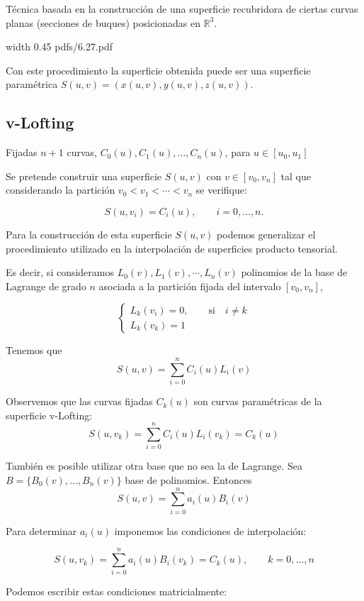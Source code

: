 \documentclass[twoside]{report}
\newcommand{\colocapdf}[2]{\quad\pdfimage width #2 {pdfs/#1.pdf}}
\begin{document}
T\'{e}cnica basada en la construcci\'{o}n de una superficie recubridora de ciertas curvas planas (secciones de buques) posicionadas en $\mathbb{R}^3.$

\begin{center}
\colocapdf{6.27}{0.45\textwidth}
\end{center}

Con este procedimiento la superficie obtenida puede ser una superficie param\'{e}trica $S(u,v)=(x(u,v),y(u,v),z(u,v))$.

\subsection{v-Lofting}

Fijadas $n+1$ curvas, $C_0(u),C_1(u), \ldots, C_n(u)$,  para $u\in [u_0,u_1]$

Se pretende construir una superficie $S(u,v)$ con  $v\in [v_0,v_n]$ tal que considerando la partici\'{o}n $v_0<v_1<\cdots <v_n$
se verifique:

$$S(u,v_i)=C_i(u),\quad \quad i=0,\ldots,n.$$

Para la construcci\'{o}n de esta superficie $S(u,v)$ podemos generalizar el procedimiento utilizado en la interpolaci\'{o}n de superficies producto tensorial.

Es decir, si consideramos $L_0(v), L_1(v), \cdots,L_n(v)$ polinomios de la base  de Lagrange de grado $n$ asociada a la partici\'{o}n fijada del intervalo $[v_0,v_n]$,

$$\left\{ \begin{array}{l}
L_k(v_i)=0,\quad \quad \mbox{si} \quad  i\neq k\\
L_k(v_k)=1
\end{array} \right.$$

Tenemos que
$$S(u,v)=\sum_{i=0}^n C_i(u) L_i(v)$$

Observemos que las curvas fijadas $C_k(u)$ son curvas param\'{e}tricas de la superficie v-Lofting:
$$S(u,v_k)=\sum_{i=0}^n C_i(u) L_i(v_k)=C_k(u)$$

Tambi\'{e}n es posible utilizar otra base que no sea la de Lagrange. Sea  $B=\{B_0(v), \ldots,B_n(v)\}$  base de polinomios. Entonces
$$S(u,v)=\sum_{i=0}^n a_i(u) B_i(v)$$

Para determinar $a_i(u)$ imponemos las condiciones de interpolaci\'{o}n:

$$S(u,v_k)=\sum_{i=0}^n a_i(u) B_i(v_k)=C_k(u), \quad \quad k=0,\ldots,n $$

Podemos escribir estas condiciones matricialmente:
\end{document}
